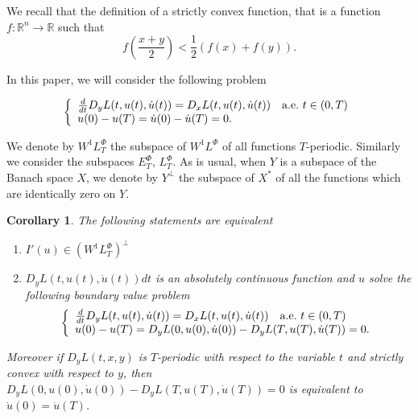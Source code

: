\documentclass[twoside]{article}
\newtheorem{cor}[thm]{Corollary}
\newcommand{\lphi}{L^{\Phi}}
\newcommand{\ephi}{E^{\Phi}}
\newcommand{\wphi}{W^{1}\lphi}
\begin{document}
We recall that the definition of a strictly convex function, that is a function $f: \mathbb{R}^n \to \mathbb{R}$ such that
\[
f\left(\frac{x+y}{2}\right)< \frac{1}{2} \left(f\left( x\right)+f\left( y\right)\right).
\]


In this paper, we will consider the following problem


\begin{equation}\label{ecualagran}
    \left\{%
\begin{array}{ll}
   \frac{d}{dt} D_{y}L(t,u(t),\dot{u}(t))= D_{x}L(t,u(t),\dot{u}(t)) \quad \hbox{a.e.}\ t \in (0,T)\\
    u(0)-u(T)=\dot{u}(0)-\dot{u}(T)=0.
\end{array}%
\right.
\end{equation}

We denote by $\wphi_T$ the subspace of $\wphi$ of all functions $T$-periodic. Similarly we consider the subspaces $\ephi_T$, $\lphi_T$. As is usual, when $Y$ is a subspace of
the Banach space $X$, we denote by $Y^{\perp}$ the subspace of $X^*$ of all the functions which are identically zero on $Y$.

\begin{cor} The following statements are equivalent
\begin{enumerate}
 \item $I'(u)\in\left( \wphi_T\right)^{\perp}$
 \item  $D_yL(t,u(t),\dot{u}(t))dt$ is an absolutely continuous function and $u$ solve the following boundary value problem
 \begin{equation}\label{ecualagran2}
    \left\{%
\begin{array}{ll}
   \frac{d}{dt} D_{y}L(t,u(t),\dot{u}(t))= D_{x}L(t,u(t),\dot{u}(t)) \quad \hbox{a.e.}\ t \in (0,T)\\
    u(0)-u(T)=D_yL(0,u(0),\dot{u}(0))-D_yL(T,u(T),\dot{u}(T))=0.
\end{array}%
\right.
\end{equation}

\end{enumerate}
Moreover if $D_yL(t,x,y)$ is $T$-periodic with respect to the variable $t$ and strictly convex with respect to $y$, then
$D_yL(0,u(0),\dot{u}(0))-D_yL(T,u(T),\dot{u}(T))=0$ is equivalent to $\dot{u}(0)=\dot{u}(T)$.

\end{cor}
\end{document}
